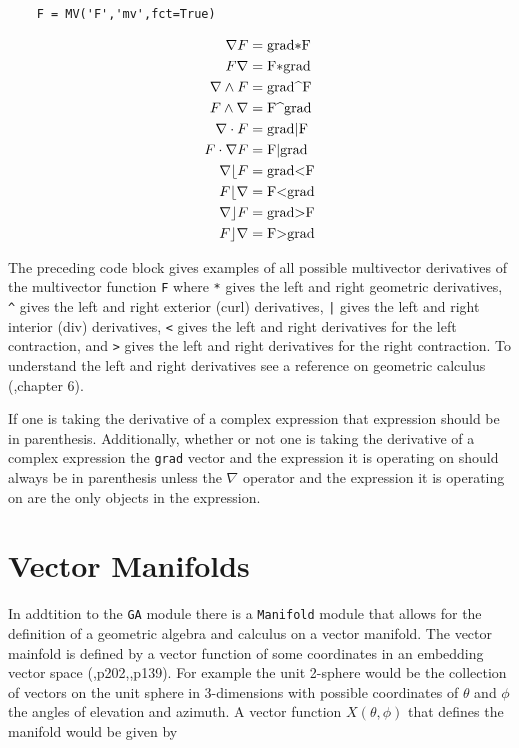 \documentclass[10pt]{article}
\newcommand{\lp}{\left (}
\newcommand{\rp}{\right )}
\newcommand{\W}{\wedge}
\newcommand{\f}[2]{{#1}\lp {#2} \rp}
\newcommand{\T}[1]{\texttt{#1}}
\begin{document}
\begin{lstlisting}
    F = MV('F','mv',fct=True)
\end{lstlisting}
      \begin{align}
            \nabla F &=  \mbox{\lstinline!grad*F!} \\
            F \nabla &=  \mbox{\lstinline!F*grad!} \\
            \nabla \W F &=  \mbox{\lstinline!grad^F!} \\
            F \W \nabla &=  \mbox{\lstinline!F^grad!} \\
            \nabla \cdot F &=  \mbox{\lstinline!grad|F!} \\
            F \cdot \nabla F &=  \mbox{\lstinline!F|grad!} \\
            \nabla \lfloor F &=  \mbox{\lstinline!grad<F!} \\
            F \lfloor \nabla &=  \mbox{\lstinline!F<grad!} \\
            \nabla \rfloor F &=  \mbox{\lstinline!grad>F!} \\
            F \rfloor \nabla &= \mbox{\lstinline!F>grad!}
      \end{align}

The preceding code block gives examples of all possible multivector
derivatives of the multivector function \T{F} where \T{*} gives the left and
right geometric derivatives, \T{\^} gives the left and right exterior (curl)
derivatives, \T{|} gives the left and right interior (div) derivatives,
\T{<} gives the left and right derivatives for the left contraction, and
\T{>} gives the left and right derivatives for the right contraction.  To
understand the left and right derivatives see a reference on geometric
calculus (\cite{Doran},chapter 6).

If one is taking the derivative of a complex expression that expression
should be in parenthesis.  Additionally, whether or not one is taking the
derivative of a complex expression the \T{grad} vector and the expression
it is operating on should always be in parenthesis unless the $\nabla$ operator
and the expression it is operating on are the only objects in the expression.

\section{Vector Manifolds}

In addtition to the \T{GA} module there is a \T{Manifold} module that allows
for the definition of a geometric algebra and calculus on a vector manifold.
The vector mainfold is defined by a vector function of some coordinates
in an embedding vector space (\cite{Doran},p202,\cite{Hestenes},p139).  For example the unit 2-sphere would be the
collection of vectors on the unit sphere in 3-dimensions with possible
coordinates of $\theta$ and $\phi$ the angles of elevation and
azimuth.  A vector function $\f{X}{\theta,\phi}$ that defines the manifold
would be given by
\end{document}
